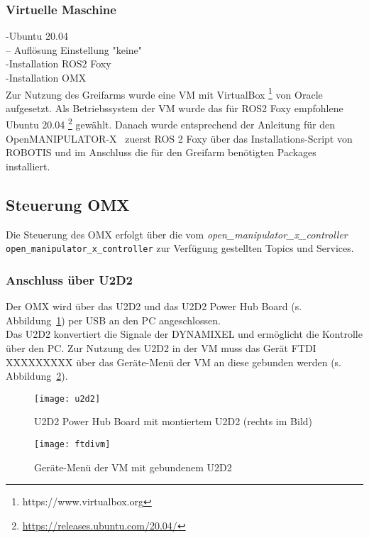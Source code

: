 \subsubsection{Virtuelle Maschine}
-Ubuntu 20.04\\
-- Auflösung Einstellung "keine"\\
-Installation ROS2 Foxy\\
-Installation OMX\\
Zur Nutzung des Greifarms wurde eine \ac{VM} mit VirtualBox {\footnote{https://www.virtualbox.org}} von Oracle aufgesetzt.
Als Betriebssystem der \ac{VM} wurde das für ROS2 Foxy empfohlene~\citep{foxyreq} Ubuntu 20.04 {\footnote{\url{https://releases.ubuntu.com/20.04/}}} gewählt.
Danach wurde entsprechend der Anleitung für den OpenMANIPULATOR-X~\citep{foxyinstall} zuerst ROS 2 Foxy über das Installations-Script von ROBOTIS und im Anschluss die für den Greifarm benötigten Packages installiert.


\subsection{Steuerung OMX}
Die Steuerung des OMX erfolgt über die vom \emph{open\_manipulator\_x\_controller}\\ \verb|open_manipulator_x_controller| zur Verfügung gestellten Topics und Services.



\subsubsection{Anschluss über U2D2}{\label{u2d2}}
Der OMX wird über das U2D2 und das U2D2 Power Hub Board (s. Abbildung~\ref{fig:u2d2}) per USB an den PC angeschlossen.\\
Das U2D2 konvertiert die Signale der DYNAMIXEL und ermöglicht die Kontrolle über den PC. Zur Nutzung des U2D2 in der \ac{VM} muss das Gerät FTDI XXXXXXXXX über das Geräte-Menü der \ac{VM} an diese gebunden werden (s. Abbildung~\ref{fig:ftdivm}).
\begin{figure}[ht!]
\centering
\texttt{[image: u2d2]}
\caption{U2D2 Power Hub Board mit montiertem U2D2 (rechts im Bild)}
\label{fig:u2d2}
\end{figure}
\begin{figure}[ht!]
\centering
\texttt{[image: ftdivm]}
\caption{Geräte-Menü der \ac{VM} mit gebundenem U2D2}
\label{fig:ftdivm}
\end{figure}



